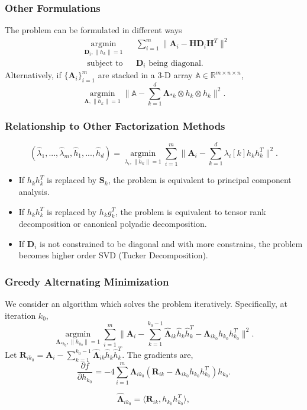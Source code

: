 \documentclass[]{beamer}
\newcommand{\bA}{\mathbf{A}}
\newcommand{\bH}{\mathbf{H}}
\newcommand{\bD}{\mathbf{D}}
\newcommand{\bS}{\mathbf{S}}
\newcommand{\bR}{\mathbf{R}}
\newcommand{\bLambda}{\mathbf{\Lambda}}
\begin{document}
\begin{frame}
	\frametitle{Other Formulations}
	The problem can be formulated in different ways
	\begin{equation*}
	\begin{aligned}  
	& \underset{\bD_i,\|h_k\|=1}{\operatorname{argmin}} 
	& & \sum\limits_{i=1}^{m} \| \bA_i- \bH \bD_i \bH^T \|  ^2 \\
	& \text{ subject to} 
	& &  \bD_i \text{ being diagonal.}
	\end{aligned}
	\end{equation*}
	Alternatively, if $\{\bA_i\}_{i=1}^m$ are stacked in a 3-D array ${\mathbb A} \in \mathbb{R}^{m\times n \times n}$,
	\[  \underset{\bLambda,\|h_k\|=1}{\operatorname{argmin}}  \| {\mathbb A} - \sum\limits_{k=1}^{d} \bLambda_{*k} \otimes h_k \otimes h_k\|  ^2.  \]
\end{frame}

\begin{frame}
	\frametitle{Relationship to Other Factorization Methods}
	\begin{equation*}
	(\hat{\lambda}_1,...,\hat{\lambda}_m,\hat{h}_1,...,\hat{h}_d) = \underset{\lambda_i,\|h_k\|=1}{\operatorname{argmin}} \sum\limits_{i=1}^{m} \| \bA_i- \sum\limits_{k=1}^{d} \lambda_{i}[k] h_k h_k^T \|  ^2.  
	\end{equation*}
	\begin{itemize}
		\item If $h_k h_k^T$ is replaced by $\bS_k$, the problem is equivalent to principal component analysis. 
		\item If $h_k h_k^T$ is replaced by $h_k g_k^T$, the problem is equivalent to tensor rank decomposition or canonical polyadic decomposition. 
		\item If $\bD_i$ is not constrained to be diagonal and with more constrains, the problem becomes higher order SVD (Tucker Decomposition).
	\end{itemize}
\end{frame}

\begin{frame}
	\frametitle{Greedy Alternating Minimization}
We consider an algorithm which solves the problem iteratively. Specifically, at iteration $k_0$, 
\[\underset{\bLambda_{*k_0},\|h_{k_0}\|=1}{\operatorname{argmin}} \sum\limits_{i=1}^{m} \| \bA_i- \sum\limits_{k=1}^{k_0-1} \hat{\bLambda}_{ik} \hat{h}_{k} \hat{h}_{k}^T -\bLambda_{ik_0} h_{k_0} h_{k_0}^T\|  ^2.\]
Let $\bR_{ik_0} = \bA_i- \sum\limits_{k=1}^{k_0-1}\hat{\bLambda}_{ik} \hat{h}_{k} \hat{h}_{k}^T$. The gradients are, 
\begin{equation} \label{eq:3}
\frac{\partial f}{\partial h_{k_0}} = -4\sum\limits_{i=1}^{m}  \bLambda_{ik_0} (\bR_{ik}-\bLambda_{ik_0} h_{k_0} h_{k_0}^T)  h_{k_0}.
\end{equation}

\begin{equation}  \label{eq:4}
\hat{\bLambda}_{i k_0} = \langle \bR_{ik}, h_{k_0} h_{k_0}^T \rangle,
\end{equation}
\end{frame}
\end{document}
